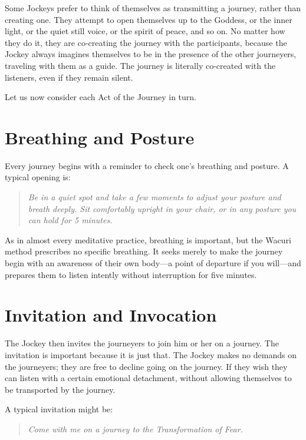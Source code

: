 \documentclass[12pt]{book}
\begin{document}
Some Jockeys prefer to think of themselves as transmitting a journey,
rather than creating one. They attempt to open themselves up to the
Goddess, or the inner light, or the quiet still voice, or the spirit
of peace, and so on. No matter how they do it, they are co-creating
the journey with the participants, because the Jockey always imagines
themselves to be in the presence of the other journeyers, traveling
with them as a guide. The journey is literally co-created with the
listeners, even if they remain silent.
					
Let us now consider each Act of the Journey in turn.
					
\section{Breathing and Posture}
					
Every journey begins with a reminder to check one’s breathing and posture. A typical opening is:
					
\begin{quote}{\em Be in a quiet spot and take a few moments to adjust your posture and breath deeply. Sit comfortably upright in your chair, or in any posture you can hold for 5 minutes.}
  \end{quote}
					
As in almost every meditative practice, breathing is important, but the Wacuri method prescribes no specific breathing. It seeks merely to make the journey begin with an awareness of their own body---a point of departure if you will--–and prepares them to listen intently without interruption for five minutes.
					
\section{Invitation and Invocation}
					
The Jockey then invites the journeyers to join him or her on a journey. The invitation is important because it is just that. The Jockey makes no demands on the journeyers; they are free to decline going on the journey. If they wish they can listen with a certain emotional detachment, without allowing themselves to be transported by the journey.
					
A typical invitation might be:
\begin{quote}{\em 
    Come with me on a journey to the Transformation of Fear.}
  \end{quote}
					
\end{document}
